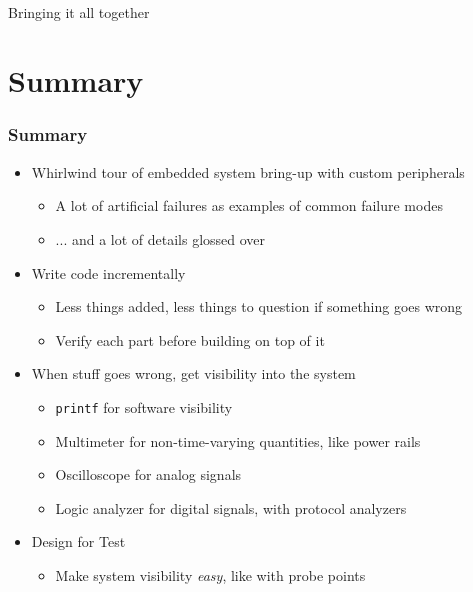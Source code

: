 \documentclass{beamer}
\begin{document}
\begin{frame}
 \\
\hfill \break
Bringing it all together
\end{frame}

\section{Summary} %

\begin{frame}
\frametitle{Summary}
\begin{itemize}
  \item Whirlwind tour of embedded system bring-up with custom peripherals
  \begin{itemize}
    \item A lot of artificial failures as examples of common failure modes
    \item ... and a lot of details glossed over
  \end{itemize}
  \item Write code incrementally
  \begin{itemize}
    \item Less things added, less things to question if something goes wrong
    \item Verify each part before building on top of it
  \end{itemize}
  \item When stuff goes wrong, get visibility into the system
  \begin{itemize}
    \item \texttt{printf} for software visibility
    \item Multimeter for non-time-varying quantities, like power rails
    \item Oscilloscope for analog signals
    \item Logic analyzer for digital signals, with protocol analyzers
  \end{itemize}  
  \item Design for Test
  \begin{itemize}
    \item Make system visibility \textit{easy}, like with probe points
  \end{itemize}  
\end{itemize}
\end{frame}
\end{document}
